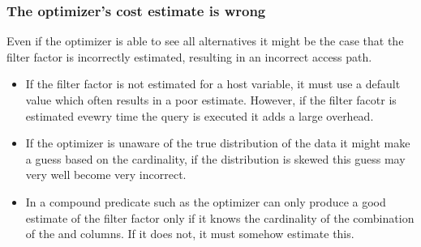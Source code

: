 \subsubsection{The optimizer's cost estimate is wrong}
Even if the optimizer is able to see all alternatives it might be the case that
the filter factor is incorrectly estimated, resulting in an incorrect access
path.

\begin{itemize}
\item If the filter factor is not estimated for a host variable, it must use a
  default value which often results in a poor estimate. However, if the filter
  facotr is estimated evewry time the query is executed it adds a large
  overhead.
\item If the optimizer is unaware of the true distribution of the data it might
  make a guess based on the cardinality, if the distribution is skewed this
  guess may very well become very incorrect.
\item In a compound predicate such as  the optimizer can only produce a good estimate of the filter factor
  only if it knows the cardinality of the combination of the  and
   columns. If it does not, it must somehow estimate this.
\end{itemize}
